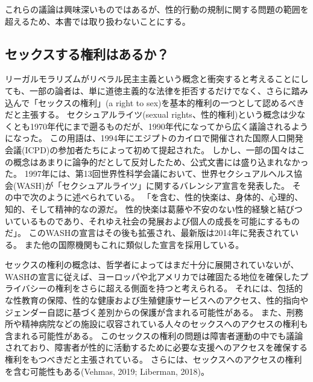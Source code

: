 \documentclass[paper=a4,book,openany]{jlreq}
\begin{document}
これらの議論は興味深いものではあるが、性的行動の規制に関する問題の範囲を超えるため、本書では取り扱わないことにする。

\subsection{セックスする権利はあるか？}

リーガルモラリズムがリベラル民主主義という概念と衝突すると考えることにしても、一部の論者は、単に道徳主義的な法律を拒否するだけでなく、さらに踏み込んで「セックスの権利」(a right to sex)を基本的権利の一つとして認めるべきだと主張する。
セクシュアルライツ(sexual rights、性的権利)という概念は少なくとも1970年代にまで遡るものだが、1990年代になってから広く議論されるようになった。
この用語は、1994年にエジプトのカイロで開催された国際人口開発会議(ICPD)の参加者たちによって初めて提起された。
しかし、一部の国々はこの概念はあまりに論争的だとして反対したため、公式文書には盛り込まれなかった\citep{correa07:_global_persp_sexual_right}。
1997年には、第13回世界性科学会議において、世界セクシュアルヘルス協会(WASH)が「セクシュアルライツ」に関するバレンシア宣言を発表した。
その中で次のように述べられている。
「を含む、性的快楽は、身体的、心理的、知的、そして精神的なの源だ。
性的快楽は葛藤や不安のない性的経験と結びついているものであり、それゆえ社会の発展および個人の成長を可能にするものだ」\citep{WASH97:_valen_declar_sexual_right}。
このWASHの宣言はその後も拡張され、最新版は2014年に発表されている。
また他の国際機関もこれに類似した宣言を採用している。

セックスの権利の概念は、哲学者によってはまだ十分に展開されていないが、WASHの宣言に従えば、ヨーロッパや北アメリカでは確固たる地位を確保したプライバシーの権利をさらに超える側面を持つと考えられる。
それには、包括的な性教育の保障、性的な健康および生殖健康サービスへのアクセス、性的指向やジェンダー自認に基づく差別からの保護が含まれる可能性がある。
また、刑務所や精神病院などの施設に収容されている人々のセックスへのアクセスの権利も含まれる可能性がある。
このセックスの権利の問題は障害者運動の中でも議論されており、障害者が性的に活動するために必要な支援へのアクセスを確保する権利をもつべきだと主張されている。
さらには、セックスへのアクセスの権利を含む可能性もある(Vehmas, 2019; Liberman, 2018)。
\nocite{vehmas19:_person_profoun_intel_disab_their_right_sex}\nocite{liberman18:_disab_sex_right_scope_sexual_exclus}
\end{document}
